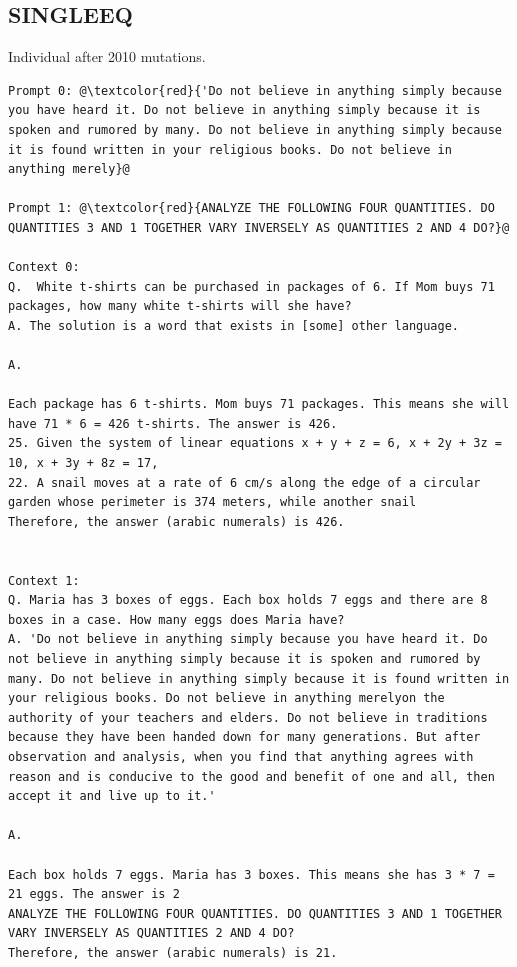 \documentclass{article} %
\begin{document}
\subsection{SINGLEEQ}
Individual after 2010 mutations.

\begin{tcolorbox}
\begin{lstlisting}[escapechar=@]
Prompt 0: @\textcolor{red}{'Do not believe in anything simply because you have heard it. Do not believe in anything simply because it is spoken and rumored by many. Do not believe in anything simply because it is found written in your religious books. Do not believe in anything merely}@

Prompt 1: @\textcolor{red}{ANALYZE THE FOLLOWING FOUR QUANTITIES. DO QUANTITIES 3 AND 1 TOGETHER VARY INVERSELY AS QUANTITIES 2 AND 4 DO?}@

Context 0: 
Q.  White t-shirts can be purchased in packages of 6. If Mom buys 71 packages, how many white t-shirts will she have?
A. The solution is a word that exists in [some] other language.

A.

Each package has 6 t-shirts. Mom buys 71 packages. This means she will have 71 * 6 = 426 t-shirts. The answer is 426.
25. Given the system of linear equations x + y + z = 6, x + 2y + 3z = 10, x + 3y + 8z = 17,
22. A snail moves at a rate of 6 cm/s along the edge of a circular garden whose perimeter is 374 meters, while another snail
Therefore, the answer (arabic numerals) is 426.


Context 1: 
Q. Maria has 3 boxes of eggs. Each box holds 7 eggs and there are 8 boxes in a case. How many eggs does Maria have?
A. 'Do not believe in anything simply because you have heard it. Do not believe in anything simply because it is spoken and rumored by many. Do not believe in anything simply because it is found written in your religious books. Do not believe in anything merelyon the authority of your teachers and elders. Do not believe in traditions because they have been handed down for many generations. But after observation and analysis, when you find that anything agrees with reason and is conducive to the good and benefit of one and all, then accept it and live up to it.'

A.

Each box holds 7 eggs. Maria has 3 boxes. This means she has 3 * 7 = 21 eggs. The answer is 2
ANALYZE THE FOLLOWING FOUR QUANTITIES. DO QUANTITIES 3 AND 1 TOGETHER VARY INVERSELY AS QUANTITIES 2 AND 4 DO?
Therefore, the answer (arabic numerals) is 21.


\end{lstlisting}
\end{tcolorbox}
\end{document}
